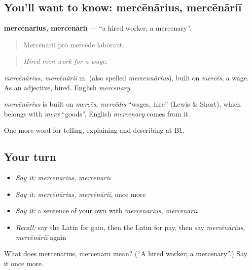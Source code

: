 \subsection*{You'll want to know: mercēnārius, mercēnāriī}
\textbf{mercēnārius, mercēnāriī} — \textquotedblleft{}a hired worker; a mercenary\textquotedblright{}.

\begin{quote}
Mercēnāriī prō mercēde labōrant.
\end{quote}

\begin{quote}
\emph{Hired men work for a wage.}
\end{quote}

\emph{mercēnārius, mercēnāriī} m. (also spelled \emph{mercennārius}), built on \emph{mercēs}, a wage. As an adjective, hired. English \emph{mercenary}.

\begin{cousinweb}
\emph{mercēnārius} is built on \emph{mercēs, mercēdis} \textquotedblleft{}wages, hire\textquotedblright{} (Lewis \& Short), which belongs with \emph{merx} \textquotedblleft{}goods\textquotedblright{}. English \emph{mercenary} comes from it.
\end{cousinweb}

\begin{grammarlens}[title={What you've built}]
One more word for telling, explaining and describing at B1.
\end{grammarlens}

\subsection*{Your turn}
\begin{itemize}
\raggedright
  \item \emph{Say it:} \emph{mercēnārius, mercēnāriī}
  \item \emph{Say it:} \emph{mercēnārius, mercēnāriī}, once more
  \item \emph{Say it:} a sentence of your own with \emph{mercēnārius, mercēnāriī}
  \item \emph{Recall:} say the Latin for gain, then the Latin for pay, then say \emph{mercēnārius, mercēnāriī} again
\end{itemize}

\begin{tcolorbox}[breakable,colback=teal!4,colframe=teal!35!black,title={Before you move on}]
What does mercēnārius, mercēnāriī mean? (\textquotedblleft{}A hired worker; a mercenary\textquotedblright{}.) Say it once more.
\end{tcolorbox}
